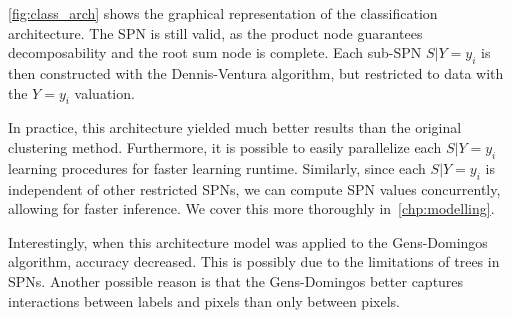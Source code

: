 \autoref{fig:class_arch} shows the graphical representation of the classification architecture. The
SPN is still valid, as the product node guarantees decomposability and the root sum node is
complete. Each sub-SPN $S|Y=y_i$ is then constructed with the Dennis-Ventura algorithm, but
restricted to data with the $Y=y_i$ valuation.

In practice, this architecture yielded much better results than the original clustering method.
Furthermore, it is possible to easily parallelize each $S|Y=y_i$ learning procedures for faster
learning runtime. Similarly, since each $S|Y=y_i$ is independent of other restricted SPNs, we can
compute SPN values concurrently, allowing for faster inference. We cover this more thoroughly
in~\autoref{chp:modelling}.

Interestingly, when this architecture model was applied to the Gens-Domingos algorithm, accuracy
decreased. This is possibly due to the limitations of trees in SPNs. Another possible reason is
that the Gens-Domingos better captures interactions between labels and pixels than only between
pixels.
